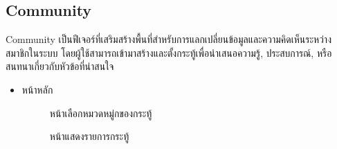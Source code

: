 \subsection {Community}
Community เป็นฟีเจอร์ที่เสริมสร้างพื้นที่สำหรับการแลกเปลี่ยนข้อมูลและความคิดเห็นระหว่างสมาชิกในระบบ โดยผู้ใช้สามารถเข้ามาสร้างและตั้งกระทู้เพื่อนำเสนอความรู้, ประสบการณ์, หรือสนทนาเกี่ยวกับหัวข้อที่น่าสนใจ\begin{itemize}
    \item หน้าหลัก
          \begin{figure}[H]\centering
              \setlength{\fboxrule}{0.2mm} %
              \setlength{\fboxsep}{0.5cm}
              \caption{\centering หน้าเลือกหมวดหมู่กของกระทู้}\label{fig:wireframe5_1}
          \end{figure}
          \begin{figure}[H]\centering
              \setlength{\fboxrule}{0.2mm} %
              \setlength{\fboxsep}{0.5cm}
              \caption{\centering หน้าแสดงรายการกระทู้}\label{fig:wireframe5_2}
          \end{figure}


\end{itemize}
